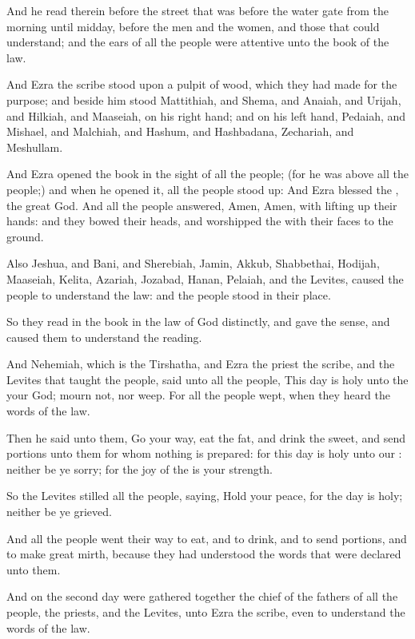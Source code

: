 \verse And he read therein before the street that was before the water gate from the morning until midday, before the men and the women, and those that could understand; and the ears of all the people were attentive unto the book of the law.

\verse And Ezra the scribe stood upon a pulpit of wood, which they had made for the purpose; and beside him stood Mattithiah, and Shema, and Anaiah, and Urijah, and Hilkiah, and Maaseiah, on his right hand; and on his left hand, Pedaiah, and Mishael, and Malchiah, and Hashum, and Hashbadana, Zechariah, and Meshullam.

\verse And Ezra opened the book in the sight of all the people; (for he was above all the people;) and when he opened it, all the people stood up: \verse And Ezra blessed the \LORD, the great God. And all the people answered, Amen, Amen, with lifting up their hands: and they bowed their heads, and worshipped the \LORD with their faces to the ground.

\verse Also Jeshua, and Bani, and Sherebiah, Jamin, Akkub, Shabbethai, Hodijah, Maaseiah, Kelita, Azariah, Jozabad, Hanan, Pelaiah, and the Levites, caused the people to understand the law: and the people stood in their place.

\verse So they read in the book in the law of God distinctly, and gave the sense, and caused them to understand the reading.

\verse And Nehemiah, which is the Tirshatha, and Ezra the priest the scribe, and the Levites that taught the people, said unto all the people, This day is holy unto the \LORD your God; mourn not, nor weep.  For all the people wept, when they heard the words of the law.

\verse Then he said unto them, Go your way, eat the fat, and drink the sweet, and send portions unto them for whom nothing is prepared: for this day is holy unto our \LORD: neither be ye sorry; for the joy of the \LORD is your strength.

\verse So the Levites stilled all the people, saying, Hold your peace, for the day is holy; neither be ye grieved.

\verse And all the people went their way to eat, and to drink, and to send portions, and to make great mirth, because they had understood the words that were declared unto them.

\verse And on the second day were gathered together the chief of the fathers of all the people, the priests, and the Levites, unto Ezra the scribe, even to understand the words of the law.

